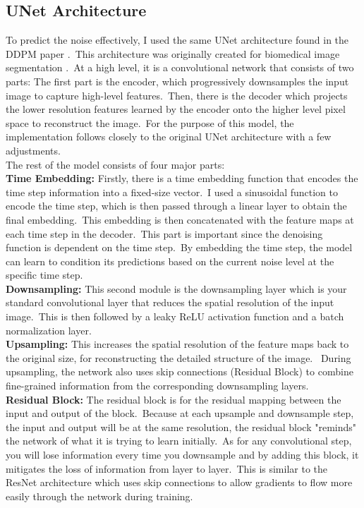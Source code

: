 \documentclass[12pt]{article}
\begin{document}
\subsection{UNet Architecture}
To predict the noise effectively, I used the same UNet architecture found in the DDPM paper \cite{ho}.\
This architecture was originally created for biomedical image segmentation \cite{unet}.\
At a high level, it is a convolutional network that consists of two parts: 
The first part is the encoder, which progressively downsamples the input image to capture high-level features.\
Then, there is the decoder which projects the lower resolution features learned by the encoder onto the higher level pixel space to reconstruct the image.\
For the purpose of this model, the implementation follows closely to the original UNet architecture with a few adjustments.\\

The rest of the model consists of four major parts:\\

\textbf{Time Embedding:} Firstly, there is a time embedding function that encodes the time step information into a fixed-size vector.\
I used a sinusoidal function to encode the time step, which is then passed through a linear layer to obtain the final embedding.\
This embedding is then concatenated with the feature maps at each time step in the decoder.\
This part is important since the denoising function is dependent on the time step.\
By embedding the time step, the model can learn to condition its predictions based on the current noise level at the specific time step.\\

\textbf{Downsampling:} This second module is the downsampling layer which is your standard convolutional layer that reduces the spatial resolution of the input image.\
This is then followed by a leaky ReLU activation function and a batch normalization layer.\\

\textbf{Upsampling:} This increases the spatial resolution of the feature maps back to the original size, for reconstructing the detailed structure of the image. \
During upsampling, the network also uses skip connections (Residual Block) to combine fine-grained information from the corresponding downsampling layers. \\

\textbf{Residual Block:} The residual block is for the residual mapping between the input and output of the block.\
Because at each upsample and downsample step, the input and output will be at the same resolution, the residual block "reminds" the network of what it is trying to learn initially.\
As for any convolutional step, you will lose information every time you downsample and by adding this block, it mitigates the loss of information from layer to layer.\
This is similar to the ResNet architecture \cite{resnet} which uses skip connections to allow gradients to flow more easily through the network during training.\\
\end{document}

